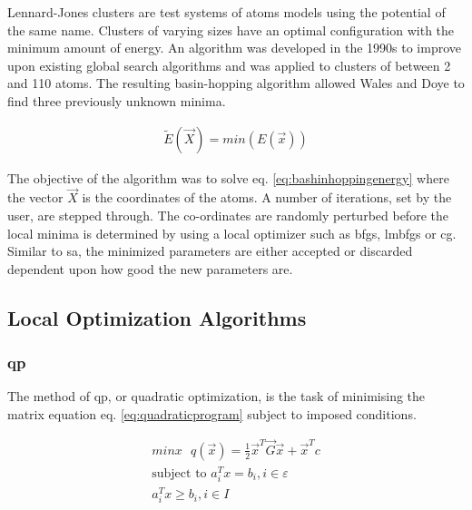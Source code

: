 Lennard-Jones clusters are test systems of atoms models using the potential of the same name.  Clusters of varying sizes have an optimal configuration with the minimum amount of energy.  An algorithm was developed in the 1990s to improve upon existing global search algorithms and was applied to clusters of between 2 and 110 atoms\cite{basinhopping}.  The resulting basin-hopping algorithm allowed Wales and Doye to find three previously unknown minima.

\begin{equation}
\begin{split}
\tilde{E}(\vec{X}) = min \left(E(\vec{x})\right)
\end{split}
\label{eq:bashinhoppingenergy}
\end{equation}

The objective of the algorithm was to solve eq. \ref{eq:bashinhoppingenergy} where the vector $\vec{X}$ is the coordinates of the atoms.  A number of iterations, set by the user, are stepped through.  The co-ordinates are randomly perturbed before the local minima is determined by using a local optimizer such as \acrshort{bfgs}, \acrshort{lmbfgs} or \acrshort{cg}\cite{basinhoppingscipy}.  Similar to \acrshort{sa}, the minimized parameters are either accepted or discarded dependent upon how good the new parameters are.



\subsection{Local Optimization Algorithms}


\subsubsection{\acrfull{qp}}

The method of \acrlong{qp}, or quadratic optimization, is the task of minimising the matrix equation eq. \ref{eq:quadraticprogram} subject to imposed conditions\cite{nocedalwright1}.

\begin{equation}
\begin{split}
min x  \text{   } q(\vec{x}) = \frac{1}{2} \vec{x}^{T} \vec{G} \vec{x} + \vec{x}^{T} c \\
\text{subject to } a_i^T x = b_i, i \in \varepsilon  \\
a_i^T x  \geq b_i,   i \in I 
\end{split}
\label{eq:quadraticprogram}
\end{equation}

